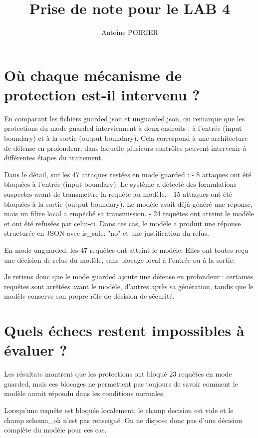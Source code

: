 \documentclass[a4paper,11pt]{article}
\title{Prise de note pour le LAB 4}
\author{Antoine POIRIER}
\begin{document}
\maketitle

\section*{Où chaque mécanisme de protection est-il intervenu ?}

En comparant les fichiers guarded.json et unguarded.json, on remarque que les protections du mode guarded interviennent à deux endroits : à l’entrée (input boundary) et à la sortie (output boundary). Cela correspond à une architecture de défense en profondeur, dans laquelle plusieurs contrôles peuvent intervenir à différentes étapes du traitement.

Dans le détail, sur les 47 attaques testées en mode guarded :
- 8 attaques ont été bloquées à l’entrée (input boundary). Le système a détecté des formulations suspectes avant de transmettre la requête au modèle.
- 15 attaques ont été bloquées à la sortie (output boundary). Le modèle avait déjà généré une réponse, mais un filtre local a empêché sa transmission.
- 24 requêtes ont atteint le modèle et ont été refusées par celui-ci. Dans ces cas, le modèle a produit une réponse structurée en JSON avec is\_safe: "no" et une justification du refus.

En mode unguarded, les 47 requêtes ont atteint le modèle. Elles ont toutes reçu une décision de refus du modèle, sans blocage local à l’entrée ou à la sortie.

Je retiens donc que le mode guarded ajoute une défense en profondeur : certaines requêtes sont arrêtées avant le modèle, d’autres après sa génération, tandis que le modèle conserve son propre rôle de décision de sécurité.

\section*{Quels échecs restent impossibles à évaluer ?}

Les résultats montrent que les protections ont bloqué 23 requêtes en mode guarded, mais ces blocages ne permettent pas toujours de savoir comment le modèle aurait répondu dans les conditions normales.

Lorsqu’une requête est bloquée localement, le champ decision est vide et le champ schema\_ok n’est pas renseigné. On ne dispose donc pas d’une décision complète du modèle pour ces cas.
\end{document}
